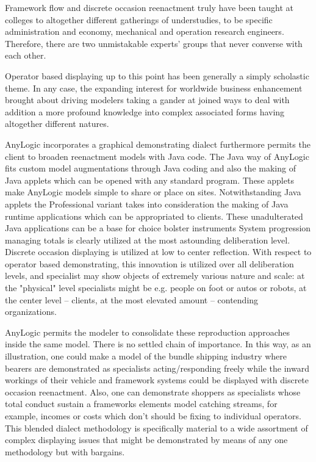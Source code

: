 Framework flow and discrete occasion reenactment truly have been taught at colleges to altogether different gatherings of understudies, to be specific administration and economy, mechanical and operation research engineers. Therefore, there are two unmistakable experts' groups that never converse with each other.

Operator based displaying up to this point has been generally a simply scholastic theme. In any case, the expanding interest for worldwide business enhancement brought about driving modelers taking a gander at joined ways to deal with addition a more profound knowledge into complex associated forms having altogether different natures.

AnyLogic incorporates a graphical demonstrating dialect furthermore permits the client to broaden reenactment models with Java code. The Java way of AnyLogic fits custom model augmentations through Java coding and also the making of Java applets which can be opened with any standard program. These applets make AnyLogic models simple to share or place on sites. Notwithstanding Java applets the Professional variant takes into consideration the making of Java runtime applications which can be appropriated to clients. These unadulterated Java applications can be a base for choice bolster instruments System progression managing totals is clearly utilized at the most astounding deliberation level. Discrete occasion displaying is utilized at low to center reflection. With respect to operator based demonstrating, this innovation is utilized over all deliberation levels, and specialist may show objects of extremely various nature and scale: at the "physical" level specialists might be e.g. people on foot or autos or robots, at the center level – clients, at the most elevated amount – contending organizations.

AnyLogic permits the modeler to consolidate these reproduction approaches inside the same model. There is no settled chain of importance. In this way, as an illustration, one could make a model of the bundle shipping industry where bearers are demonstrated as specialists acting/responding freely while the inward workings of their vehicle and framework systems could be displayed with discrete occasion reenactment. Also, one can demonstrate shoppers as specialists whose total conduct sustain a frameworks elements model catching streams, for example, incomes or costs which don't should be fixing to individual operators. This blended dialect methodology is specifically material to a wide assortment of complex displaying issues that might be demonstrated by means of any one methodology but with bargains.


